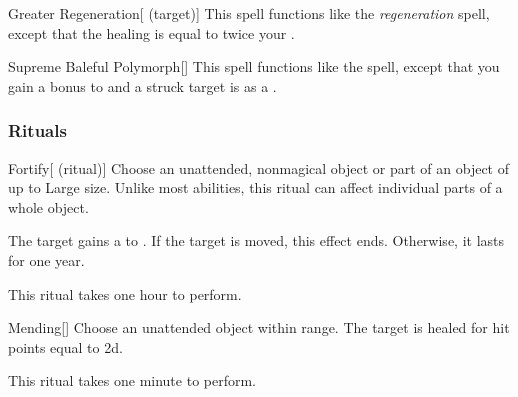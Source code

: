\lowercase{\hypertarget{spell:Greater Regeneration}{}}\label{spell:Greater Regeneration}
\begin{attuneability}[\nth{7}]{\hypertarget{spell:Greater Regeneration}{Greater Regeneration}}[ (target)]
This spell functions like the \textit{regeneration} spell, except that the healing is equal to twice your .
\end{attuneability}
\vspace{0.25em}



\lowercase{\hypertarget{spell:Supreme Baleful Polymorph}{}}\label{spell:Supreme Baleful Polymorph}
\begin{apability}[\nth{7}]{\hypertarget{spell:Supreme Baleful Polymorph}{Supreme Baleful Polymorph}}[]
This spell functions like the  spell, except that you gain a  bonus to  and a struck target is  as a .
\end{apability}
\vspace{0.25em}



\subsubsection{Rituals}


\lowercase{\hypertarget{spell:Fortify}{}}\label{spell:Fortify}
\begin{attuneability}[\nth{1}]{\hypertarget{spell:Fortify}{Fortify}}[ (ritual)]
Choose an unattended, nonmagical object or part of an object of up to Large size.
Unlike most abilities, this ritual can affect individual parts of a whole object.

The target gains a   to .
If the target is moved, this effect ends.
Otherwise, it lasts for one year.

This ritual takes one hour to perform.
\end{attuneability}
\vspace{0.25em}



\lowercase{\hypertarget{spell:Mending}{}}\label{spell:Mending}
\begin{apability}[\nth{1}]{\hypertarget{spell:Mending}{Mending}}[]
Choose an unattended object within \rngclose range.
The target is healed for hit points equal to  \plus2d.

This ritual takes one minute to perform.
\end{apability}
\vspace{0.25em}



